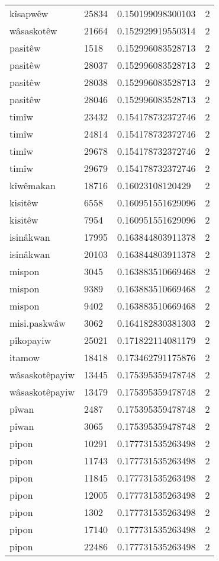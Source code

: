 \begin{longtable}{llll}
kîsapwêw & 25834 & 0.150199098300103 & 2 \\
wâsaskotêw & 21664 & 0.152929919550314 & 2 \\
pasitêw & 1518 & 0.152996083528713 & 2 \\
pasitêw & 28037 & 0.152996083528713 & 2 \\
pasitêw & 28038 & 0.152996083528713 & 2 \\
pasitêw & 28046 & 0.152996083528713 & 2 \\
timîw & 23432 & 0.154178732372746 & 2 \\
timîw & 24814 & 0.154178732372746 & 2 \\
timîw & 29678 & 0.154178732372746 & 2 \\
timîw & 29679 & 0.154178732372746 & 2 \\
kîwêmakan & 18716 & 0.16023108120429 & 2 \\
kisitêw & 6558 & 0.160951551629096 & 2 \\
kisitêw & 7954 & 0.160951551629096 & 2 \\
isinâkwan & 17995 & 0.163844803911378 & 2 \\
isinâkwan & 20103 & 0.163844803911378 & 2 \\
mispon & 3045 & 0.163883510669468 & 2 \\
mispon & 9389 & 0.163883510669468 & 2 \\
mispon & 9402 & 0.163883510669468 & 2 \\
misi.paskwâw & 3062 & 0.164182830381303 & 2 \\
pîkopayiw & 25021 & 0.171822114081179 & 2 \\
itamow & 18418 & 0.173462791175876 & 2 \\
wâsaskotêpayiw & 13445 & 0.175395359478748 & 2 \\
wâsaskotêpayiw & 13479 & 0.175395359478748 & 2 \\
pîwan & 2487 & 0.175395359478748 & 2 \\
pîwan & 3065 & 0.175395359478748 & 2 \\
pipon & 10291 & 0.177731535263498 & 2 \\
pipon & 11743 & 0.177731535263498 & 2 \\
pipon & 11845 & 0.177731535263498 & 2 \\
pipon & 12005 & 0.177731535263498 & 2 \\
pipon & 1302 & 0.177731535263498 & 2 \\
pipon & 17140 & 0.177731535263498 & 2 \\
pipon & 22486 & 0.177731535263498 & 2 \\

\end{longtable}
